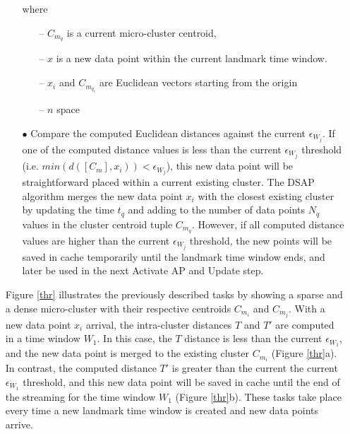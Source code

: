 \documentclass[../UNBThesis2.tex]{subfiles}
\begin{document}
\begin{itemize}[leftmargin=*]
\begin{itemize}
    where
    \begin{itemize}
        \item[--] $C_{m_q}$ is a current micro-cluster centroid,
        \item[--] $x$ is a new data point within the current landmark time window.
        \item[--] $x_{i}$ and $C_{m_{q_i}}$ are Euclidean vectors starting from the origin
        \item[--] $n$ space
    \end{itemize}
     
    


    \item[$\bullet$] Compare the computed Euclidean distances against the current $\epsilon_{W_j}$. If one of the computed distance values is less than the current $\epsilon_{W_j}$ threshold (i.e. $min(d([C_{m}],x_i)) < \epsilon_{W_j}$), this new data point will be straightforward placed within a current existing cluster. The DSAP algorithm merges the new data point $x_i$ with the closest existing cluster by updating  the time $t_q$ and adding to the number of data points $N_q$ values in the cluster centroid tuple $C_{m_q}$. However, if all computed distance values are higher than the current $\epsilon_{W_j}$ threshold, the new points will be saved in cache temporarily until the landmark time window ends, and later be used in the next Activate AP and Update step.    
\end{itemize}

Figure \ref{thr} illustrates the previously described tasks by showing a sparse and a dense micro-cluster with their respective centroids $C_{m_i}$ and $C_{m_j}$. With a new data point $x_i$ arrival, the intra-cluster distances $T$ and $T'$ are computed in a time window $W_1$. In this case, the $T$ distance is less than the current $\epsilon_{W_1}$, and the new data point is merged to the existing cluster $C_{m_i}$ (Figure \ref{thr}a). In contrast, the computed distance $T'$ is greater than the current the current $\epsilon_{W_1}$ threshold, and this new data point will be saved in cache until the end of the streaming for the time window $W_1$ (Figure \ref{thr}b). These tasks take place every time a new landmark time window is created and new data points arrive.
     

\end{itemize}
\end{document}
